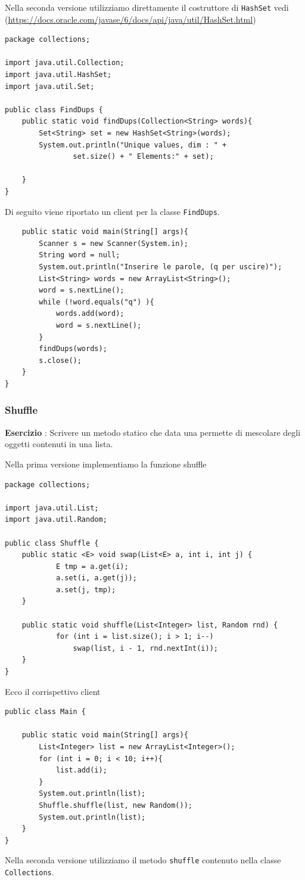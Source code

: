 \documentclass{article}
\begin{document}
Nella seconda versione utilizziamo direttamente il costruttore di \texttt{HashSet} vedi (\url{https://docs.oracle.com/javase/6/docs/api/java/util/HashSet.html})
\begin{lstlisting}
package collections;

import java.util.Collection;
import java.util.HashSet;
import java.util.Set;

public class FindDups {
	public static void findDups(Collection<String> words){
		Set<String> set = new HashSet<String>(words);
		System.out.println("Unique values, dim : " + 
				set.size() + " Elements:" + set);
		
	}
}

\end{lstlisting}
Di seguito viene riportato un client per la classe \texttt{FindDups}.
\begin{lstlisting}
	public static void main(String[] args){
		Scanner s = new Scanner(System.in);
		String word = null;
		System.out.println("Inserire le parole, (q per uscire)");
		List<String> words = new ArrayList<String>();
		word = s.nextLine();		
		while (!word.equals("q") ){
			words.add(word);
			word = s.nextLine();
		} 
		findDups(words);
		s.close();
	}
}
\end{lstlisting}

\subsubsection{Shuffle}
\begin{framed}
\textbf{Esercizio }: Scrivere un metodo statico che data una permette di mescolare degli oggetti contenuti in una lista.
\end{framed}
Nella prima versione implementiamo la funzione shuffle 
\begin{lstlisting}
package collections;

import java.util.List;
import java.util.Random;

public class Shuffle {
	public static <E> void swap(List<E> a, int i, int j) {
		    E tmp = a.get(i);
		    a.set(i, a.get(j));
		    a.set(j, tmp);
	}
	
	public static void shuffle(List<Integer> list, Random rnd) {
		    for (int i = list.size(); i > 1; i--)
		        swap(list, i - 1, rnd.nextInt(i));
	}
}
\end{lstlisting}
Ecco il corrispettivo client
\begin{lstlisting}
public class Main {

	public static void main(String[] args){
		List<Integer> list = new ArrayList<Integer>();
		for (int i = 0; i < 10; i++){
			list.add(i);
		}
		System.out.println(list);
		Shuffle.shuffle(list, new Random());
		System.out.println(list);
	}
}
\end{lstlisting}
Nella seconda versione utilizziamo il metodo \texttt{shuffle} contenuto nella classe \texttt{Collections}.
\end{document}
